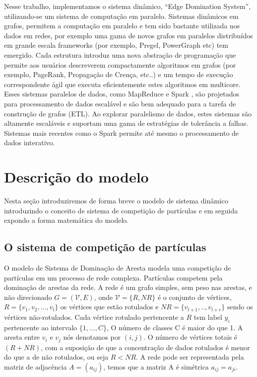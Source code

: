 \documentclass[conference]{IEEEtran}
\begin{document}
Nesse trabalho, implementamos o sistema dinâmico, ``Edge Domination System'', utilizando-se um sistema de computação em paralelo. Sistemas dinâmicos em grafos, permitem a computação em paralelo e tem sido bastante utilizada nos dados em redes, por exemplo uma gama de novos grafos em paralelos distribuídos em grande escala frameworks (por exemplo, Pregel\cite{b10}, PowerGraph\cite{b11} etc) tem emergido. Cada estrutura introduz uma nova abstração de programação que permite aos usuários descreverem compactamente algoritmos em grafos (por exemplo, PageRank, Propagação de Crença, etc..) e um tempo de execução correspondente ágil que executa eficientemente estes algoritmos em multicore. Esses sistemas paralelos de dados, como MapReduce e Spark \cite{b9}, são projetados para processamento de dados escalável e são bem adequado para a tarefa de construção de grafos (ETL). Ao explorar
paralelismo de dados, estes sistemas são altamente escaláveis e suportam uma gama de estratégias de tolerância a falhas. Sistemas mais recentes como o Spark permite até mesmo o processamento de dados interativo. 

  
\section{Descrição do modelo}

Nesta seção introduziremos de forma breve o modelo de sistema dinâmico introduzindo o conceito de sistema de competição de partículas e em seguida expondo a forma matemática do modelo.

\subsection{O sistema de competição de partículas}

O modelo de Sistema de Dominação de Aresta modela uma competição de partículas em um processo de rede complexa. Partículas competem pela dominação de arestas da rede. A rede é um grafo simples, sem peso nas arestas, e não direcionado $G =(\mathcal{V} , E)$, onde $\mathcal{V}=\{R,NR\}$ é o conjunto de vértices, $R = \{v_{1},v_{2},...,v_{l}\}$ os vértices que estão rotulados e $NR= \{v_{l+1},..,v_{l+r}\}$ sendo os vértices não-rotulados. Cada vértice rotulado pertencente a $R$ tem label $y_{i}$ pertencente ao intervalo $\{1,...,C\}$, O número de classes C é maior do que 1. A aresta entre $v_{i}$ e $v_{j}$ nós denotamos por $(i,j)$. O número de vértices totais é $(R + NR)$, com a suposição de que a concentração de dados rotulados é menor do que a de não rotulados, ou seja $R<NR$. A rede pode ser representada pela matriz de adjacência $A = (a_{ij})$, temos que a matriz A é simétrica $a_{ij}=a_{ji}$.
\end{document}
